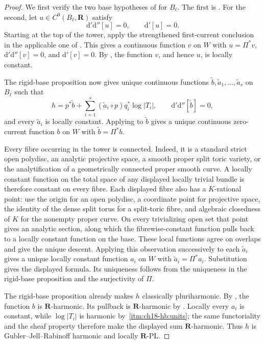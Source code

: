 \begin{proof}
We first verify the two base hypotheses of
 for $B_\ell$.  The first is
.  For the second, let
$u\in C^0(B_\ell,\mathbf R)$ satisfy
\[
             \mathrm d'\mathrm d''[u]=0,
             \qquad \mathrm d'[u]=0.
\]
Starting at the top of the tower, apply the strengthened first-current
conclusion in the applicable one of
.
This gives a continuous function $v$ on $W$ with
$u=\Pi^*v$, $\mathrm d'\mathrm d''[v]=0$, and $\mathrm d'[v]=0$.
By , the function $v$, and
hence $u$, is locally constant.

The rigid-base proposition now gives unique continuous functions
$\widetilde b,\widetilde a_1,\ldots,\widetilde a_s$ on $B_\ell$ such that
\[
 h=p^*\widetilde b+
   \sum_{i=1}^s(\widetilde a_i\circ p)q_i^*\log|T_i|,
 \qquad \mathrm d'\mathrm d''[\widetilde b]=0,
\]
and every $\widetilde a_i$ is locally constant.  Applying
 to $\widetilde b$ gives a
unique continuous zero-current function $b$ on $W$ with
$\widetilde b=\Pi^*b$.

Every fibre occurring in the tower is connected.  Indeed, it is a standard
strict open polydisc, an analytic projective space, a smooth proper split
toric variety, or the analytification of a geometrically connected proper
smooth curve.  A locally constant function on the total space of any
displayed locally trivial bundle is therefore constant on every fibre.
Each displayed fibre also has a $K$-rational point: use the origin for an
open polydisc, a coordinate point for projective space, the identity of the
dense split torus for a split-toric fibre, and algebraic closedness of $K$
for the nonempty proper curve.  On every trivializing open set that point
gives an analytic section, along which the fibrewise-constant function pulls
back to a locally constant function on the base.  These local functions
agree on overlaps and give the unique descent.  Applying this observation
successively to each $\widetilde a_i$ gives a unique locally constant
function $a_i$ on $W$ with $\widetilde a_i=\Pi^*a_i$.  Substitution gives
the displayed formula.
Its uniqueness follows from the uniqueness in the rigid-base proposition
and the surjectivity of $\Pi$.

The rigid-base proposition already makes $h$ classically pluriharmonic.
By , the function $b$ is
$\mathbf R$-harmonic.  Its pullback is $\mathbf R$-harmonic by
.  Locally every $a_i$ is constant,
while $\log|T_i|$ is harmonic by
\,\cref{itm:ch18-hb:units}; the same
functoriality and the sheaf property therefore make the displayed sum
$\mathbf R$-harmonic.  Thus $h$ is Gubler--Jell--Rabinoff harmonic and
locally $\mathbf R$-PL.
\end{proof}

